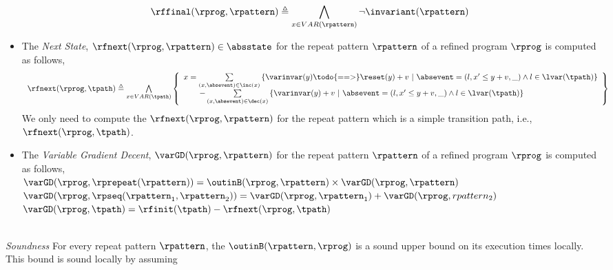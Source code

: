 \begin{itemize}
\[
  \rffinal(\rprog, \rpattern) \triangleq 
  \bigwedge_{x \in VAR(\rpattern)}
  \neg \invariant(\rpattern)
  \]
\item The \emph{Next State}, $\rfnext(\rprog, \rpattern) \in \absstate$ for the repeat pattern $\rpattern$ of a refined program $\rprog$ is computed as follows,
%
\[
  \begin{array}{l}
  \rfnext(\rprog, \tpath) \triangleq 
  \bigwedge\limits_{x \in VAR(\tpath)}
  \left\{ 
    \begin{array}{l}
  x =   \sum\limits_{(x, \absevent) \in \inc(x) }
  \left\{ 
    {\varinvar(y) \todo{==>} \reset(y)}+ v ~\middle\vert~ \absevent = (l, x' \leq y + v, \_) \land l \in \lvar(\tpath)\right\}
    \\ \qquad 
    - \sum\limits_{(x, \absevent) \in \dec(x) }\left\{ 
      \varinvar(y) + v ~\middle\vert~ \absevent = (l, x' \leq y + v, \_) \land l \in \lvar(\tpath) \right\}
    \end{array}
  \right\}
  \end{array}
\]
We only need to compute the $\rfnext(\rprog, \rpattern)$ for the repeat pattern which is a simple transition path,
i.e., $\rfnext(\rprog, \tpath)$.
\item  The \emph{Variable Gradient Decent}, $\varGD(\rprog, \rpattern)$ for the repeat pattern $\rpattern$ of a refined program $\rprog$ is computed as follows,
\\
{$\varGD(\rprog, \rprepeat(\rpattern)) =  \outinB(\rprog, \rpattern) \times {\varGD(\rprog, \rpattern)}$}
\\
$\varGD(\rprog, \rpseq(\rpattern_1, \rpattern_2)) =  \varGD(\rprog, \rpattern_1)+ \varGD(\rprog, rpattern_2)$
\\
$\varGD(\rprog, \tpath) =  \rfinit(\tpath) - \rfnext(\rprog, \tpath)$
\end{itemize}
\\
\emph{Soundness} For every repeat pattern $\rpattern$, the $\outinB(\rpattern, \rprog)$
is a sound upper bound on its execution times locally.
\\
This bound is sound locally by assuming
